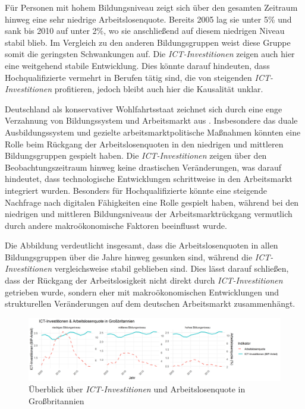 Für Personen mit hohem Bildungsniveau zeigt sich über den gesamten Zeitraum hinweg 
eine sehr niedrige Arbeitslosenquote. Bereits 2005 lag sie unter 5\% und sank bis
2010 auf unter 2\%, wo sie anschließend auf diesem niedrigen Niveau stabil blieb. 
Im Vergleich zu den anderen Bildungsgruppen weist diese Gruppe somit die geringsten 
Schwankungen auf. Die \textit{\ac{ICT}-Investitionen} zeigen auch hier eine 
weitgehend stabile Entwicklung. Dies könnte darauf hindeuten, dass Hochqualifizierte 
vermehrt in Berufen tätig sind, die von steigenden \textit{\ac{ICT}-Investitionen} 
profitieren, jedoch bleibt auch hier die Kausalität unklar.

Deutschland als konservativer Wohlfahrtsstaat zeichnet sich durch eine enge Verzahnung 
von Bildungssystem und Arbeitsmarkt aus \parencite[vgl.][S. 21–22]{hall2001varieties}. 
Insbesondere das duale Ausbildungssystem und gezielte arbeitsmarktpolitische Maßnahmen 
könnten eine Rolle beim Rückgang der 
Arbeitslosenquoten in den niedrigen und mittleren Bildungsgruppen gespielt haben. 
Die \textit{\ac{ICT}-Investitionen} zeigen über den Beobachtungszeitraum hinweg keine 
drastischen Veränderungen, was darauf hindeutet, dass technologische Entwicklungen 
schrittweise in den Arbeitsmarkt integriert wurden. Besonders für Hochqualifizierte 
könnte eine steigende Nachfrage nach digitalen Fähigkeiten eine Rolle gespielt 
haben, während bei den niedrigen und mittleren Bildungsniveaus der 
Arbeitsmarktrückgang vermutlich durch andere makroökonomische Faktoren beeinflusst 
wurde.

Die Abbildung verdeutlicht insgesamt, dass die Arbeitslosenquoten in allen 
Bildungsgruppen über die Jahre hinweg gesunken sind, während die 
\textit{\ac{ICT}-Investitionen} vergleichsweise stabil geblieben sind. Dies lässt darauf 
schließen, dass der Rückgang der Arbeitslosigkeit nicht direkt durch 
\textit{\ac{ICT}-Investitionen} getrieben wurde, sondern eher mit makroökonomischen 
Entwicklungen und strukturellen Veränderungen auf dem deutschen Arbeitsmarkt 
zusammenhängt.

\begin{figure}[htbp]
    \centering
    \includegraphics[width=\textwidth]{assets/plot_uk_final.png}
    \caption{Überblick über \textit{\ac{ICT}-Investitionen} und Arbeitslosenquote in 
    Großbritannien}
    \label{fig:uk}
\end{figure}

